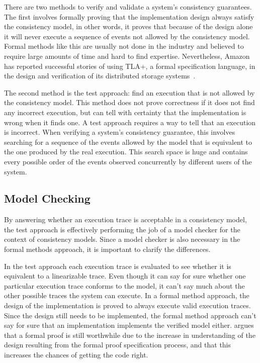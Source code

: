 \documentclass[12pt,conference]{IEEEtran}
\begin{document}
There are two methods to verify and validate a system's consistency guarantees. The first involves formally proving that the implementation design always satisfy the consistency model, in other words, it proves that because of the design alone it will never execute a sequence of events not allowed by the consistency model. Formal methods like this are usually not done in the industry and believed to require large amounts of time and hard to find expertise. Nevertheless, Amazon has reported successful stories of using TLA+, a formal specification language, in the design and verification of its distributed storage systems~\cite{newcombe2014use}.

The second method is the test approach: find an execution that is not allowed by the consistency model. This method does not prove correctness if it does not find any incorrect execution, but can tell with certainty that the implementation is wrong when it finds one. A test approach requires a way to tell that an execution is incorrect. When verifying a system's consistency guarantee, this involves searching for a sequence of the events allowed by the model that is equivalent to the one produced by the real execution. This search space is huge and contains every possible order of the events observed concurrently by different users of the system. 

\subsection{Model Checking}

By answering whether an execution trace is acceptable in a consistency model, the test approach is effectively performing the job of a model checker for the context of consistency models. Since a model checker is also necessary in the formal methods approach, it is important to clarify the differences. 

In the test approach each execution trace is evaluated to see whether it is equivalent to a linearizable trace. Even though it can say for sure whether one particular execution trace conforms to the model, it can't say much about the other possible traces the system can execute. In a formal method approach, the design of the implementation is proved to always execute valid execution traces. Since the design still needs to be implemented, the formal method approach can't say for sure that an implementation implements the verified model either. \cite{newcombe2014use} argues that a formal proof is still worthwhile due to the increase in understanding of the design resulting from the formal proof specification process, and that this increases the chances of getting the code right.
\end{document}
